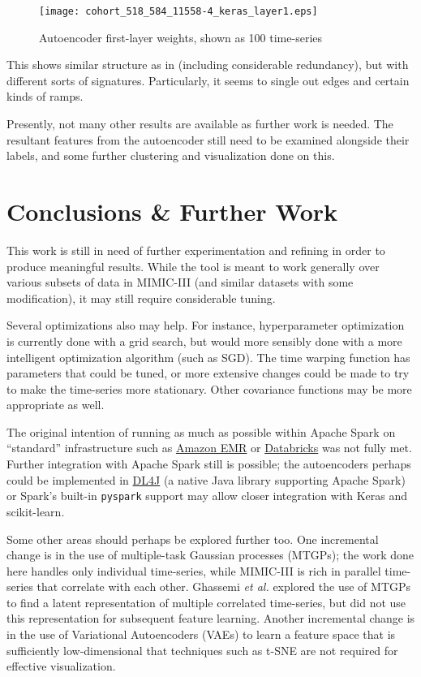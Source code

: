 \documentclass[journal]{IEEEtran}
\begin{document}
\begin{figure}
  \texttt{[image: cohort\_518\_584\_11558-4\_keras\_layer1.eps]}
  \caption{Autoencoder first-layer weights, shown as 100 time-series}
  \label{fig:keras_hidden1}
\end{figure}

This shows similar structure as in \cite{Lasko2013} (including
considerable redundancy), but with different sorts of signatures.
Particularly, it seems to single out edges and certain kinds of ramps.

Presently, not many other results are available as further work is
needed.  The resultant features from the autoencoder still need to be
examined alongside their labels, and some further clustering and
visualization done on this.

\section{Conclusions \& Further Work}

This work is still in need of further experimentation and refining in
order to produce meaningful results.  While the tool is meant to work
generally over various subsets of data in MIMIC-III (and similar
datasets with some modification), it may still require considerable
tuning.

Several optimizations also may help.  For instance, hyperparameter
optimization is currently done with a grid search, but would more
sensibly done with a more intelligent optimization algorithm (such as
SGD).  The time warping function has parameters that could be tuned,
or more extensive changes\cite{Lasko2015} could be made to try to make
the time-series more stationary.  Other covariance functions may be
more appropriate as well.

The original intention of running as much as possible within Apache
Spark on ``standard'' infrastructure such as
\href{https://aws.amazon.com/emr/}{Amazon EMR} or
\href{https://databricks.com/}{Databricks} was not fully met.  Further
integration with Apache Spark still is possible; the autoencoders
perhaps could be implemented in
\href{https://deeplearning4j.org/}{DL4J} (a native Java library
supporting Apache Spark) or Spark's built-in \texttt{pyspark} support
may allow closer integration with Keras and scikit-learn.

Some other areas should perhaps be explored further too.  One
incremental change is in the use of multiple-task Gaussian processes
(MTGPs); the work done here handles only individual time-series, while
MIMIC-III is rich in parallel time-series that correlate with each
other.  Ghassemi \emph{et al.}\cite{Ghassemi2015} explored the use of
MTGPs to find a latent representation of multiple correlated
time-series, but did not use this representation for subsequent
feature learning.  Another incremental change is in the use of
Variational Autoencoders (VAEs) to learn a feature space that is
sufficiently low-dimensional that techniques such as t-SNE are not
required for effective visualization.
\end{document}
